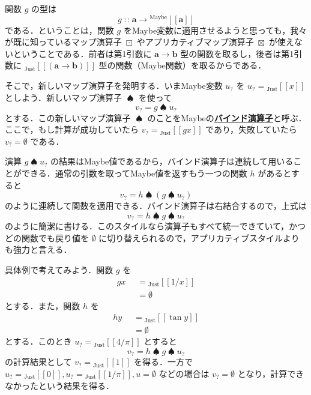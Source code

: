 \documentclass[a5paper,twoside,fleqn,draft]{jsbook}
\def\[{[\![}
\def\]{]\!]}
\newcommand{\keyword}[1]{{\underline{\textbf{#1}}}}
\newcommand{\mKeyword}[1]{\mathsf{#1}}
\newcommand{\mOtherwiseKeyword}{\mKeyword{otherwise}}
\DeclareMathOperator{\mOtherwise}{\mOtherwiseKeyword}
\newcommand{\mNothing}{\emptyset}
\DeclareMathOperator{\mAppMapMaybe}{\boxtimes}
\DeclareMathOperator{\mBindMaybe}{\spadesuit}
\DeclareMathOperator{\mFuncArrow}{\rightarrow}
\DeclareMathOperator{\mIn}{{:\!:}}
\DeclareMathOperator{\mMapMaybe}{\boxdot}
\newcommand{\mType}[1]{\mathbf{#1}} %
\newcommand{\mA}{\mType{a}}
\newcommand{\mB}{\mType{b}}
\newcommand{\mTypeAssemble}[2]{{}^\mathrm{#1}\[\mType{#2}\]}
\newcommand{\mMaybeType}[1]{\mTypeAssemble{Maybe}{#1}}
\newcommand{\mValueConstructor}[1]{\mathrm{#1}}
\newcommand{\mValueWith}[2]{{}_\mValueConstructor{#1}\[#2\]}
\newcommand{\mJustWith}[1]{\mValueWith{Just}{#1}}
\newcommand{\mMaybe}[1]{{#1}_?}
\newcommand{\mGuard}[1]{\mathop{\mid_{#1}}}
\newcommand{\mProjEXP}[2]{#1\mFuncArrow#2} %
\begin{document}
関数 $g$ の型は
\begin{equation}
  g\mIn\mProjEXP{\mA }{\mMaybeType{a}}
\end{equation}
である．ということは，関数 $g$ をMaybe変数に適用させるようと思っても，我々が既に知っているマップ演算子 $\mMapMaybe$ やアプリカティブマップ演算子 $\mAppMapMaybe$ が使えないということである．前者は第1引数に $\mProjEXP{\mA }{\mB }$ 型の関数を取るし，後者は第1引数に $\mJustWith{(\mProjEXP{\mA }{\mB })}$ 型の関数（Maybe関数）を取るからである．


そこで，新しいマップ演算子を発明する．いまMaybe変数 $\mMaybe{u}$ を $\mMaybe{u}=\mJustWith{x}$ としよう．新しいマップ演算子 $\mBindMaybe$ を使って
\begin{equation}
  \mMaybe{v}=g\mBindMaybe\mMaybe{u}
\end{equation}
とする．この新しいマップ演算子 $\mBindMaybe$ のことをMaybeの\keyword{バインド演算子}と呼ぶ．ここで，もし計算が成功していたら $\mMaybe{v}=\mJustWith{gx}$ であり，失敗していたら $\mMaybe{v}=\mNothing$ である．

演算 $g\mBindMaybe\mMaybe{u}$ の結果はMaybe値であるから，バインド演算子は連続して用いることができる．通常の引数を取ってMaybe値を返すもう一つの関数 $h$ があるとすると
\begin{equation}
  \mMaybe{v}=h\mBindMaybe{}(g\mBindMaybe\mMaybe{u})
\end{equation}
のように連続して関数を適用できる．バインド演算子は右結合するので，上式は
\begin{equation}
  \label{eq:maybe-z-bind-style}
  \mMaybe{v}=h\mBindMaybe g\mBindMaybe\mMaybe{u}
\end{equation}
のように簡潔に書ける．このスタイルなら演算子もすべて統一できていて，かつどの関数でも戻り値を $\mNothing$ に切り替えられるので，アプリカティブスタイルよりも強力と言える．

具体例で考えてみよう．関数 $g$ を
\begin{equation}
  \begin{aligned}
    gx&\mGuard{x\neq0}=\mJustWith{1/x}\\
    &\mGuard{\mOtherwise}=\mNothing
  \end{aligned}
\end{equation}
とする．また，関数 $h$ を
\begin{equation}
  \begin{aligned}
    hy&\mGuard{-\frac{\pi}{2}<y<\frac{\pi}{2}}=\mJustWith{\tan y}\\
    &\mGuard{\mOtherwise}=\mNothing
  \end{aligned}
\end{equation}
とする．このとき $\mMaybe{u}=\mJustWith{4/\pi}$ とすると
\begin{equation}
\mMaybe{v}=h\mBindMaybe g\mBindMaybe\mMaybe{u}
\end{equation}
の計算結果として $\mMaybe{v}=\mJustWith{1}$ を得る．一方で $\mMaybe{u}=\mJustWith{0},\mMaybe{u}=\mJustWith{1/\pi},u=\mNothing$ などの場合は $\mMaybe{v}=\mNothing$ となり，計算できなかったという結果を得る．
\end{document}
